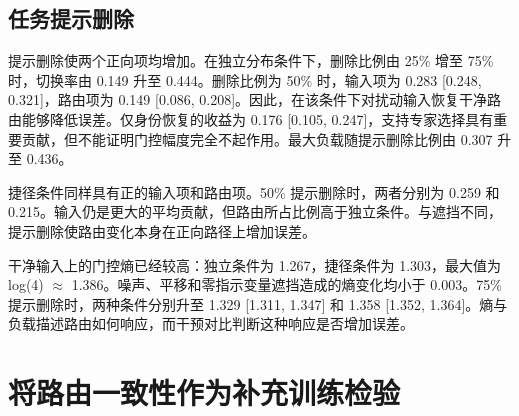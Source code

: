 \documentclass[10pt,letterpaper]{article}
\begin{document}
\begin{table}[!htbp]
\centering
\caption{独立分布下的信息丢失效应，单位为原始 MSE 变化。遮挡指示变量保持为零。}
\label{tab:results5}
\small
\setlength{\tabcolsep}{4pt}
\renewcommand{\arraystretch}{1.1}
\ifdim\wd\reporttablebox>\linewidth
\resizebox{\linewidth}{!}{\usebox{\reporttablebox}}
\else\usebox{\reporttablebox}\fi
\end{table}


\subsection{任务提示删除}

提示删除使两个正向项均增加。在独立分布条件下，删除比例由 25\% 增至 75\% 时，切换率由 0.149 升至 0.444。删除比例为 50\% 时，输入项为 0.283 [0.248, 0.321]，路由项为 0.149 [0.086, 0.208]。因此，在该条件下对扰动输入恢复干净路由能够降低误差。仅身份恢复的收益为 0.176 [0.105, 0.247]，支持专家选择具有重要贡献，但不能证明门控幅度完全不起作用。最大负载随提示删除比例由 0.307 升至 0.436。


捷径条件同样具有正的输入项和路由项。50\% 提示删除时，两者分别为 0.259 和 0.215。输入仍是更大的平均贡献，但路由所占比例高于独立条件。与遮挡不同，提示删除使路由变化本身在正向路径上增加误差。


干净输入上的门控熵已经较高：独立条件为 1.267，捷径条件为 1.303，最大值为 log(4) \ensuremath{\approx} 1.386。噪声、平移和零指示变量遮挡造成的熵变化均小于 0.003。75\% 提示删除时，两种条件分别升至 1.329 [1.311, 1.347] 和 1.358 [1.352, 1.364]。熵与负载描述路由如何响应，而干预对比判断这种响应是否增加误差。


\FloatBarrier

\section{将路由一致性作为补充训练检验}
\end{document}

